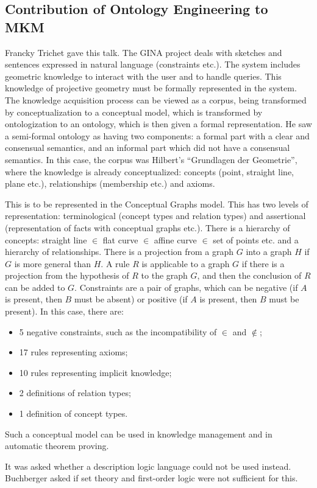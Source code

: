 \documentclass[11pt, a4paper]{article}
\begin{document}
\subsection{Contribution of Ontology Engineering to MKM}
Francky Trichet gave this talk. The GINA project deals with sketches and
sentences expressed in natural language (constraints etc.). The system
includes geometric knowledge to interact with the user and to handle
queries. This knowledge of projective geometry must be formally represented
in the system. The knowledge acquisition process can be viewed as a corpus,
being transformed by conceptualization to a conceptual model, which is
transformed by ontologization to an ontology, which is then given a formal
representation. He saw a semi-formal ontology as having two components: a
formal part with a clear and consensual semantics, and an informal part
which did not have a consensual semantics. In this case, the corpus was
Hilbert's ``Grundlagen der Geometrie'', where the knowledge is already
conceptualized: concepts (point, straight line, plane etc.), relationships
(membership etc.) and axioms.
\par
This is to be represented in the Conceptual Graphs model. This has two
levels of representation: terminological (concept types and relation types)
and assertional (representation of facts with conceptual graphs etc.).
There is a hierarchy of concepts: straight line $\in$ flat curve $\in$
affine curve $\in$ set of points etc. and a hierarchy of relationships.
There is a projection from a graph $G$ into a graph $H$ if $G$ is more
general than $H$. A rule $R$ is applicable to a graph $G$ if there is a
projection from the hypothesis of $R$ to the graph $G$, and then the
conclusion of $R$ can be added to $G$. Constraints are a pair of graphs,
which can be negative (if $A$ is present, then $B$ must be absent) or
positive (if $A$ is present, then $B$ must be present). In this case, there
are:
\begin{itemize}
\item 5 negative constraints, such as the incompatibility of $\in$ and
$\notin$;
\item 17 rules representing axioms;
\item 10 rules representing implicit knowledge;
\item 2 definitions of relation types;
\item 1 definition of concept types.
\end{itemize}
Such a conceptual model can be used in knowledge management and in
automatic theorem proving.
\par
It was asked whether a description logic language could not be used
instead. Buchberger asked if set theory and first-order logic were not
sufficient for this.
\end{document}

